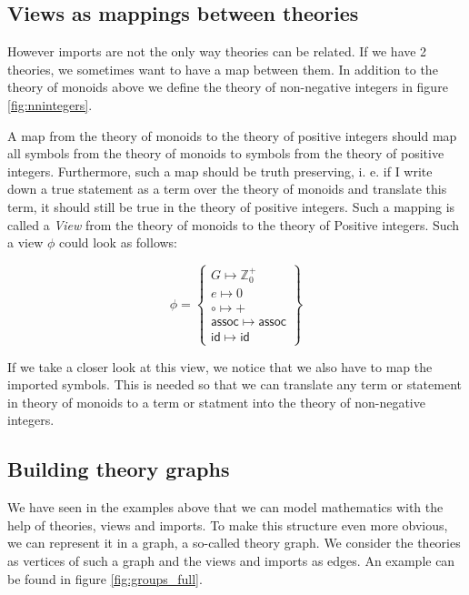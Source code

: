 

\subsection{Views as mappings between theories}

However imports are not the only way theories can be related. If we have 2 theories, we sometimes want to have a map between them. In addition to the theory of monoids above we define the theory of non-negative integers in figure \ref{fig:nnintegers}.



A map from the theory of monoids to the theory of positive integers should map all symbols from the theory of monoids to symbols from the theory of positive integers. Furthermore, such a map should be truth preserving, i. e. if I write down a true statement as a term over the theory of monoids and translate this term, it should still be true  in the theory of positive integers. Such a mapping is called a \textit{View} from the theory of monoids to the theory of Positive integers. Such a view $\phi$ could look as follows:

\[
  \phi=\left\{\begin{array}{l}
  G \mapsto \mathbb{Z}^{+}_{0}\\
  e \mapsto 0\\
  \circ \mapsto +\\
  \mathsf{assoc} \mapsto \mathsf{assoc}\\
  \mathsf{id} \mapsto \mathsf{id}
  \end{array}\right\}
\]

If we take a closer look at this view, we notice that we also have to map the imported symbols. This is needed so that we can translate any term or statement in theory of monoids to a term or statment into the theory of non-negative integers.

\subsection{Building theory graphs}

 We have seen in the examples above that we can model mathematics with the help of theories, views and imports. To make this structure even more obvious, we can represent it in a graph, a so-called theory graph. We consider the theories as vertices of such a graph and the views and imports as edges. An example can be found in figure \ref{fig:groups_full}.


